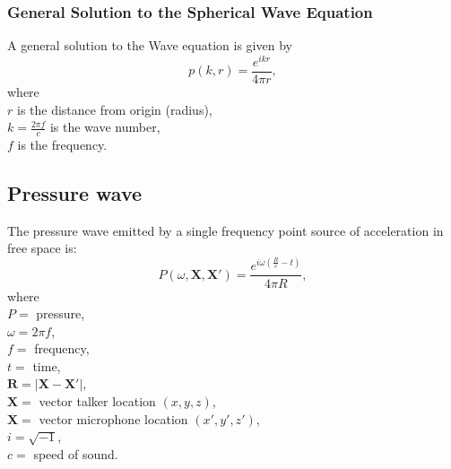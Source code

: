 \subsubsection{General Solution to the Spherical Wave Equation}
A general solution to the Wave equation is given by
\begin{equation}
    p(k,r) = \frac{e^{ikr}}{4\pi r},
\end{equation}
where\\
$r$ is the distance from origin (radius),\\
$k=\frac{2\pi f}{c}$ is the wave number,\\
$f$ is the frequency.


\subsection{Pressure wave}
The pressure wave emitted by a single frequency point source of acceleration in free space\cite{Allen1979} is:
\begin{equation}
    P(\omega,\mathbf{X},\mathbf{X'}) = \frac{e^{i\omega(\frac{R}{c}-t)}}{4\pi R},
\end{equation}
where\\
$P=$ pressure,\\
$\omega=2\pi f$,\\
$f=$ frequency,\\
$t=$ time,\\
$\mathbf{R}=|\mathbf{X}-\mathbf{X}'|$,\\
$\mathbf{X}=$ vector talker location $(x,y,z)$,\\
$\mathbf{X}=$ vector microphone location $(x',y',z')$,\\
$i=\sqrt{-1}$,\\
$c=$ speed of sound.
